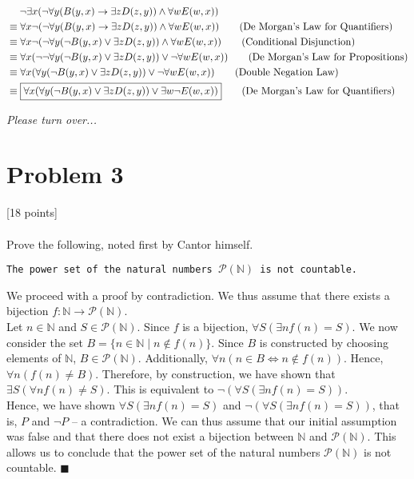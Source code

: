 \documentclass[answers]{exam}
\newcommand{\pt}[1]{\vspace{-0.8em}\textcolor{myDColor}{[#1 points]} \\\\}
\renewcommand{\qed}{
   $\blacksquare$\\
}
\newenvironment{colored}[1][]{
    \bgroup\color{#1}
}{
\egroup\vspace{-0.8em}
}
\newenvironment{problem}[1][Problem]{\section*{\textcolor{myLColor}{#1}}}{\vspace{0.2em}}
\renewenvironment{solution}[1][]{\begin{answer}[#1]\begin{colored}[mySolColor]}{\end{colored}\end{answer}\vspace{1em}}
\newcommand{\pto}{
\begin{flushright}
    \textit{\textcolor{myDColor}{Please turn over...}}
\end{flushright}\pagebreak}
\begin{document}
\begin{solution}
\begin{enumerate}[(a)]
        \vspace{-3\baselineskip}
        \begin{align}
            & \quad\; \neg \exists x (\neg \forall y (B(y,x) \rightarrow \exists z D(z,y)) \land \forall w E(w,x)) \notag \\
            & \equiv \forall x \neg(\neg \forall y (B(y,x) \rightarrow \exists z D(z,y)) \land \forall w E(w,x)) \tag{De Morgan's Law for Quantifiers}\\
            & \equiv \forall x \neg(\neg \forall y (\neg B(y,x) \vee \exists z D(z,y)) \land \forall w E(w,x)) \tag{Conditional Disjunction}\\
            & \equiv \forall x (\neg\neg \forall y (\neg B(y,x) \vee \exists z D(z,y)) \vee \neg\forall w E(w,x)) \tag{De Morgan's Law for Propositions}\\
            & \equiv \forall x (\forall y (\neg B(y,x) \vee \exists z D(z,y)) \vee \neg\forall w E(w,x)) \tag{Double Negation Law}\\
            & \equiv \boxed{\forall x (\forall y (\neg B(y,x) \vee \exists z D(z,y)) \vee \exists w \neg E(w,x))} \tag{De Morgan's Law for Quantifiers}
        \end{align}
    \end{enumerate}
\end{solution}

\pto

\begin{problem}[Problem 3]
    \pt{18}
    \noindent Prove the following, noted first by Cantor himself.
    \begin{center}
        \texttt{The power set of the natural numbers $\mathcal{P}(\mathbb{N})$ is not countable.}
    \end{center}
\end{problem}

\begin{solution}[by contradiction]
    \noindent We proceed with a proof by contradiction. We thus assume that there exists a bijection $f: \mathbb{N} \to \mathcal{P}(\mathbb{N})$.\\

    \noindent Let $n \in \mathbb{N}$ and $S \in \mathcal{P}(\mathbb{N})$. Since $f$ is a bijection, $\forall S (\exists n f(n) = S)$. We now consider the set $B = \{n \in \mathbb{N} \;|\; n \not\in f(n)\}$. Since $B$ is constructed by choosing elements of $\mathbb{N}$, $B \in \mathcal{P}(\mathbb{N})$. Additionally, $\forall n (n \in B \iff n \not\in f(n))$. Hence, $\forall n (f(n) \neq B)$. Therefore, by construction, we have shown that $\exists S(\forall n f(n) \neq S)$. This is equivalent to $\neg(\forall S (\exists n f(n) = S))$.\\

    \noindent Hence, we have shown $\forall S (\exists n f(n) = S)$ and $\neg(\forall S (\exists n f(n) = S))$, that is, $P$ and $\neg P$ -- a contradiction. We can thus assume that our initial assumption was false and that there does not exist a bijection between $\mathbb{N}$ and $\mathcal{P}(\mathbb{N})$. This allows us to conclude that the power set of the natural numbers $\mathcal{P}(\mathbb{N})$ is not countable.\qed
\end{solution}
\end{document}
